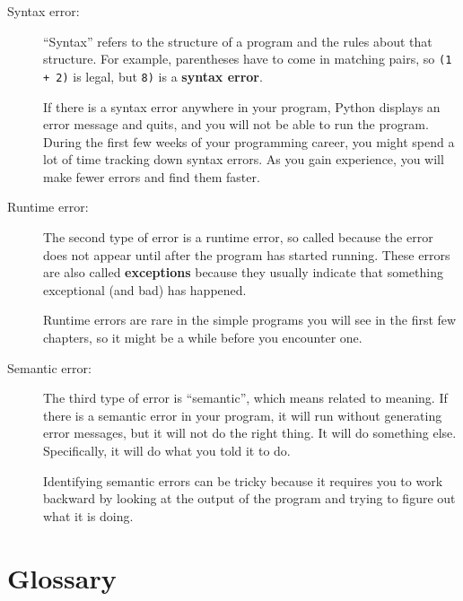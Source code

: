 \documentclass[10pt]{book}
\begin{document}
\begin{description}

\item[Syntax error:] ``Syntax'' refers to the structure of a program
  and the rules about that structure.  For example, parentheses have
  to come in matching pairs, so {\tt (1 + 2)} is legal, but {\tt 8)}
  is a {\bf syntax error}.   

If there is a syntax error
anywhere in your program, Python displays an error message and quits,
and you will not be able to run the program.  During the first few
weeks of your programming career, you might spend a lot of
time tracking down syntax errors.  As you gain experience, you will
make fewer errors and find them faster.


\item[Runtime error:] The second type of error is a runtime error, so
  called because the error does not appear until after the program has
  started running.  These errors are also called {\bf exceptions}
  because they usually indicate that something exceptional (and bad)
  has happened.   
    

Runtime errors are rare in the simple programs you will see in the
first few chapters, so it might be a while before you encounter one.


\item[Semantic error:] The third type of error is ``semantic'', which
  means related to meaning.  If there is a semantic error in your
  program, it will run without generating error messages, but it will
  not do the right thing.  It will do something else.  Specifically,
  it will do what you told it to do.  
   

Identifying semantic errors can be tricky because it requires you to work
backward by looking at the output of the program and trying to figure
out what it is doing.

\end{description}


\section{Glossary}
\end{document}
